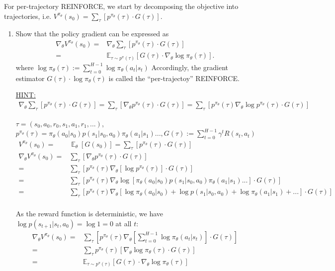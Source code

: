 \documentclass[11pt]{article}
\theoremstyle{case}
\DeclareMathOperator{\E}{\mathbb{E}}
\begin{document}
For per-trajectory REINFORCE, we start by decomposing the objective into trajectories, i.e. $V^{\pi_\theta}(s_0) = \sum_\tau [p^{\pi_\theta}(\tau) \cdot G(\tau) ]$.

\begin{enumerate}[label=(\alph*)]
    \item  Show that the policy gradient can be expressed as 
    \begin{align*}
        \nabla_\theta V^{\pi_\theta}(s_0) =& \nabla_\theta \sum_\tau [p^{\pi_\theta}(\tau) \cdot G(\tau) ]\\ 
        =& \mathbb{E}_{\tau\sim p^\pi(\tau)} \left[ G(\tau) \cdot \nabla_\theta \log\pi_\theta(\tau) \right].
    \end{align*}
    where $\log\pi_\theta(\tau) := \sum_{t=0}^{H-1} \log\pi_\theta(a_t|s_t)$
    Accordingly, the gradient estimator $G(\tau) \cdot \log\pi_\theta(\tau)$ is called the ``per-trajectoy'' REINFORCE.
    
    \underline{HINT:}
    \begin{align*}
        \nabla_\theta \sum_\tau [ p^{\pi_\theta}(\tau) \cdot G(\tau) ] = \sum_\tau [\nabla_\theta  p^{\pi_\theta}(\tau) \cdot G(\tau) ] = \sum_\tau [p^{\pi_\theta}(\tau) \nabla_\theta \log p^{\pi_\theta}(\tau) \cdot G(\tau) ]
    \end{align*}
    \begin{shaded}
			$\tau=(s_0, a_0, r_0, s_1, a_1, r_1,...)$, $p^{\pi_\theta}(\tau) = \pi_\theta(a_0|s_0)p(s_1|s_0,a_0)\pi_\theta(a_1|s_1)..., G(\tau) := \sum_{t=0}^{H-1} \gamma^t R(s_t, a_t)$
\begin{align*}
        V^{\pi_\theta}(s_0) =&\E _{\theta} [ G(s_0)] = \sum_\tau [p^{\pi_\theta}(\tau) \cdot G(\tau) ]\\ 
				\nabla_\theta 	V^{\pi_\theta}(s_0) = & \sum_\tau [\nabla_\theta  p^{\pi_\theta}(\tau) \cdot G(\tau) ]\\
    = & \sum_\tau [p^{\pi_\theta}(\tau) \nabla_\theta [\log p^{\pi_\theta}(\tau)] \cdot G(\tau) ]\\
	  = & \sum_\tau [p^{\pi_\theta}(\tau) \nabla_\theta \log [  \pi_\theta(a_0|s_0)p(s_1|s_0,a_0)\pi_\theta(a_1|s_1)... ] \cdot G(\tau) ]\\
		= & \sum_\tau [p^{\pi_\theta}(\tau) \nabla_\theta [  \log \pi_\theta(a_0|s_0) + \log p(s_1|s_0,a_0) + \log \pi_\theta(a_1|s_1) + ... ] \cdot G(\tau) ]\\
\end{align*}

As the reward function is deterministic, we have $\log p(s_{t+1}|s_{t},a_{0}) = \log 1 = 0 $ at all $t$:
\begin{align*}
\nabla_\theta 	V^{\pi_\theta}(s_0) = & \sum_\tau [p^{\pi_\theta}(\tau) \nabla_\theta [ \sum_{t = 0}^{H-1} \log \pi_\theta(a_t|s_t) ] \cdot G(\tau) ]\\
= & \sum_\tau p^{\pi_\theta}(\tau) [\nabla_\theta \log\pi_\theta(\tau) \cdot G(\tau) ]\\
=& \mathbb{E}_{\tau\sim p^\pi(\tau)} \left[ G(\tau) \cdot \nabla_\theta \log\pi_\theta(\tau) \right]\\
\end{align*}
\end{shaded}
    

\end{enumerate}
\end{document}
